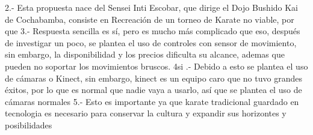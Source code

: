2.- Esta propuesta nace del Sensei Inti Escobar, que dirige el Dojo Bushido Kai de Cochabamba, consiste en  Recreación de un torneo de Karate no viable, por que
3.- Respuesta sencilla es sí, pero es mucho más complicado que eso, después de investigar un poco, se plantea el uso de controles con sensor de movimiento, sin embargo, la disponibilidad y los precios dificulta su alcance, ademas que pueden no soportar los movimientos bruscos.
4si .- Debido a esto se plantea el uso de cámaras o Kinect, sin embargo, kinect es un equipo caro que no tuvo grandes éxitos, por lo que es normal que nadie vaya a usarlo, así que se plantea el uso de cámaras normales
5.- Esto es importante ya que karate tradicional guardado en tecnologia es necesario para conservar la cultura y expandir sus horizontes y posibilidades

















